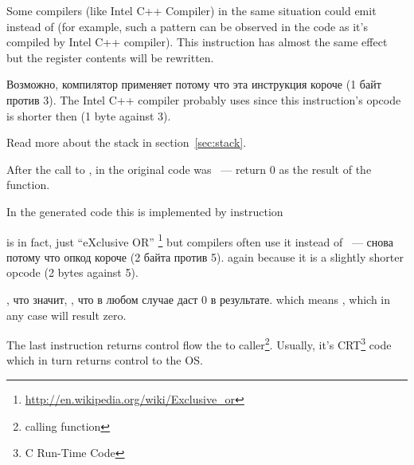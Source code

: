 {Some compilers (like Intel C++ Compiler) in the same situation could emit  
instead of \ADD (for example, such a pattern can be observed in the \oracle{} code as it's compiled by Intel C++ compiler).
This instruction has almost the same effect but the \ECX register contents will be rewritten.}

\IFRU
{Возможно, компилятор применяет  потому что эта инструкция короче (1 байт против 3).}
{The Intel C++ compiler probably uses  since this instruction's opcode is shorter then 
 (1 byte against 3).}

{Read more about the stack in section}~\ref{sec:stack}.

{After the call to \printf, in the original \CCpp code was  ~--- 
return $0$ as the result of the \main function.}

{In the generated code this is implemented by instruction}  

{\XOR is in fact, just ``eXclusive OR''}
\footnote{\url{http://en.wikipedia.org/wiki/Exclusive_or}}
{but compilers often use it instead of}
 ~--- 
\IFRU
{снова потому что опкод короче (2 байта против 5).}
{again because it is a slightly shorter opcode (2 bytes against 5).}

, 
\IFRU
{что значит, , что в любом случае даст 0 в результате.}
{which means , which in any case will result zero.}

{The last instruction \RET returns control flow the to caller\footnote{calling function}.
Usually, it's \CCpp CRT\footnote{C Run-Time Code} code which in turn
returns control to the \ac{OS}.}


